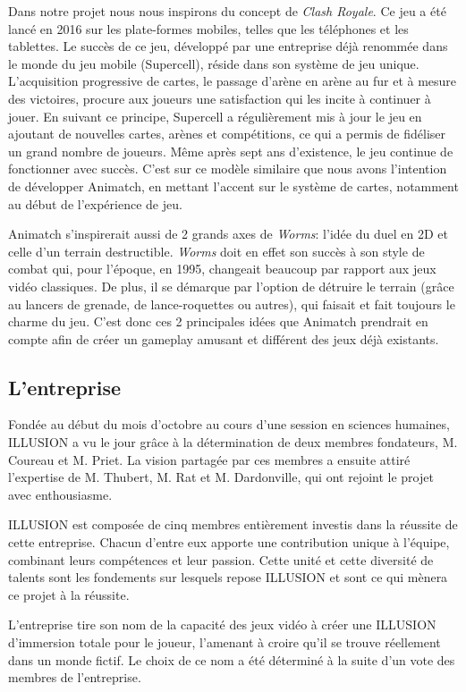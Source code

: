 \documentclass[12pt,a4paper]{article}
\begin{document}
Dans notre projet nous nous inspirons du concept de \textit{Clash Royale}. Ce jeu a été lancé en 2016 sur les plate-formes mobiles, telles que les téléphones et les tablettes. Le succès de ce jeu, développé par une entreprise déjà renommée dans le monde du jeu mobile (Supercell), réside dans son système de jeu unique. L'acquisition progressive de cartes, le passage d'arène en arène au fur et à mesure des victoires, procure aux joueurs une satisfaction qui les incite à continuer à jouer. En suivant ce principe, Supercell a régulièrement mis à jour le jeu en ajoutant de nouvelles cartes, arènes et compétitions, ce qui a permis de fidéliser un grand nombre de joueurs. Même après sept ans d'existence, le jeu continue de fonctionner avec succès. C'est sur ce modèle similaire que nous avons l'intention de développer Animatch, en mettant l'accent sur le système de cartes, notamment au début de l'expérience de jeu.

Animatch s'inspirerait aussi de 2 grands axes de \textit{Worms}: l'idée du duel en 2D et celle d'un terrain destructible. \textit{Worms} doit en effet son succès à son style de combat qui, pour l'époque, en 1995, changeait beaucoup par rapport aux jeux vidéo classiques. De plus, il se démarque par l'option de détruire le terrain (grâce au lancers de grenade, de lance-roquettes ou autres),  qui faisait et fait toujours le charme du jeu. C'est donc ces 2 principales idées que Animatch prendrait en compte afin de créer un gameplay amusant et différent des jeux déjà existants.
\clearpage

\subsection{L'entreprise}
Fondée au début du mois d'octobre au cours d'une session en sciences humaines, ILLUSION a vu le jour grâce à la détermination de deux membres fondateurs, M. Coureau et M. Priet. La vision partagée par ces membres a ensuite attiré l'expertise de M. Thubert, M. Rat et M. Dardonville, qui ont rejoint le projet avec enthousiasme.

ILLUSION est composée de cinq membres entièrement investis dans la réussite de cette entreprise. Chacun d'entre eux apporte une contribution unique à l'équipe, combinant leurs compétences et leur passion. Cette unité et cette diversité de talents sont les fondements sur lesquels repose ILLUSION et sont ce qui mènera ce projet à la réussite.

L'entreprise tire son nom de la capacité des jeux vidéo à créer une ILLUSION d'immersion totale pour le joueur, l'amenant à croire qu'il se trouve réellement dans un monde fictif. Le choix de ce nom a été déterminé à la suite d'un vote des membres de l'entreprise.
\end{document}
